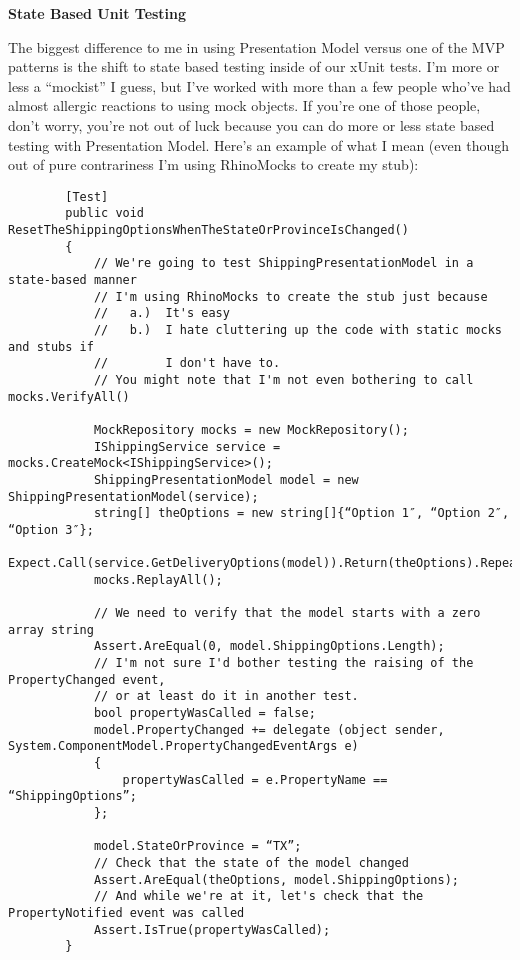 \documentclass{article}
\begin{document}
{\Large {\textbf{State Based Unit Testing}}

The biggest difference to me in using Presentation Model versus one of the MVP patterns is the shift to state based testing inside of our xUnit tests.  I'm more or less a “mockist” I guess, but I've worked with more than a few people who've had almost allergic reactions to using mock objects.  If you're one of those people, don't worry, you're not out of luck because you can do more or less state based testing with Presentation Model.  Here's an example of what I mean (even though out of pure contrariness I'm using RhinoMocks to create my stub):
\begin{lstlisting}
        [Test]
        public void ResetTheShippingOptionsWhenTheStateOrProvinceIsChanged()
        {
            // We're going to test ShippingPresentationModel in a state-based manner
            // I'm using RhinoMocks to create the stub just because
            //   a.)  It's easy
            //   b.)  I hate cluttering up the code with static mocks and stubs if
            //        I don't have to.
            // You might note that I'm not even bothering to call mocks.VerifyAll() 

            MockRepository mocks = new MockRepository();
            IShippingService service = mocks.CreateMock<IShippingService>();
            ShippingPresentationModel model = new ShippingPresentationModel(service);
            string[] theOptions = new string[]{“Option 1″, “Option 2″, “Option 3″};
            Expect.Call(service.GetDeliveryOptions(model)).Return(theOptions).Repeat.Any();
            mocks.ReplayAll();

            // We need to verify that the model starts with a zero array string
            Assert.AreEqual(0, model.ShippingOptions.Length);
            // I'm not sure I'd bother testing the raising of the PropertyChanged event,
            // or at least do it in another test.
            bool propertyWasCalled = false;
            model.PropertyChanged += delegate (object sender, System.ComponentModel.PropertyChangedEventArgs e)
			{
				propertyWasCalled = e.PropertyName == “ShippingOptions”;
			}; 

            model.StateOrProvince = “TX”;
            // Check that the state of the model changed
            Assert.AreEqual(theOptions, model.ShippingOptions);
            // And while we're at it, let's check that the PropertyNotified event was called
            Assert.IsTrue(propertyWasCalled);
        }
\end{lstlisting}

}
\end{document}
